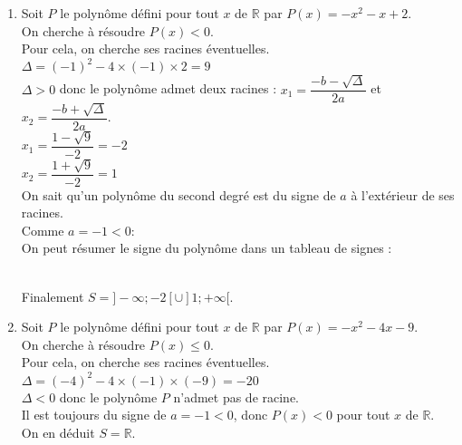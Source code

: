 \documentclass[a4paper,11pt,exos]{nsi} %
\begin{document}
\begin{enumerate}[itemsep=1em]
    \item Soit $P$ le polynôme défini pour tout $x$ de $\mathbb R$ par $P(x)=-x^2-x+2$.\\On cherche à résoudre $P(x)< 0$.\\Pour cela, on cherche ses racines éventuelles.\\$\Delta = (-1)^2-4\times(-1)\times2=9$\\$\Delta>0$ donc le polynôme admet deux racines : $x_1 = \dfrac{-b-\sqrt{\Delta}}{2a}$ et $x_2 = \dfrac{-b+\sqrt{\Delta}}{2a}$.\\$x_1 =\dfrac{1-\sqrt{9}}{-2}=-2$\\$x_2 =\dfrac{1+\sqrt{9}}{-2}=1$\\On sait qu'un polynôme du second degré est du signe de $a$ à l'extérieur de ses racines.\\Comme $a=-1<0 :$\\On peut résumer le signe du polynôme dans un tableau de signes :\\
    \\[.5em]
    Finalement $S=]-\infty;-2[\cup]1;+\infty[$.
    
    \item Soit $P$ le polynôme défini pour tout $x$ de $\mathbb R$ par $P(x)=-x^2-4x-9$.\\On cherche à résoudre $P(x)\leqslant 0$.\\Pour cela, on cherche ses racines éventuelles.\\$\Delta = (-4)^2-4\times(-1)\times(-9)=-20$\\$\Delta<0$ donc le polynôme $P$ n'admet pas de racine.\\ Il est toujours du signe de $a=-1<0$, donc $P(x)<0$ pour tout $x$ de $\mathbb{R}$.\\ On en déduit $S=\mathbb{R}$.
    

\end{enumerate}
\end{document}
